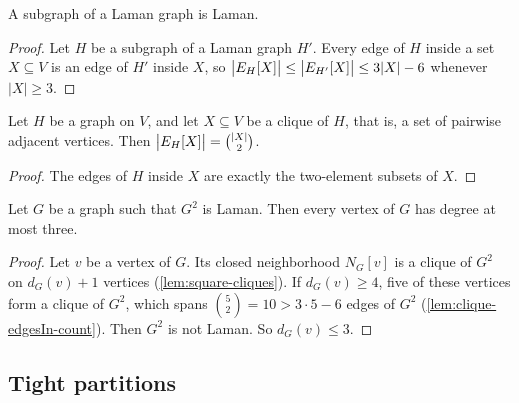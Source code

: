 \begin{lemma}[Monotonicity]
  \label{lem:isLaman3-mono}
  \leanok
  A subgraph of a Laman graph is Laman.
\end{lemma}
\begin{proof}
  \leanok
  Let $H$ be a subgraph of a Laman graph $H'$. Every edge of $H$ inside
  a set $X \subseteq V$ is an edge of $H'$ inside $X$, so
  $\bigl|\edgesIn[H]{X}\bigr| \le \bigl|\edgesIn[H']{X}\bigr|
  \le 3|X| - 6$ whenever $|X| \ge 3$.
\end{proof}

\begin{lemma}
  \label{lem:clique-edgesIn-count}
  \leanok
  Let $H$ be a graph on $V$, and let $X \subseteq V$ be a clique of $H$,
  that is, a set of pairwise adjacent vertices. Then
  $\bigl|\edgesIn[H]{X}\bigr| = \binom{|X|}{2}$.
\end{lemma}
\begin{proof}
  \leanok
  The edges of $H$ inside $X$ are exactly the two-element subsets of
  $X$.
\end{proof}

\begin{lemma}
  \label{lem:isLaman3-degree-le-three}
  \leanok
  Let $G$ be a graph such that $G^2$ is Laman. Then every vertex of $G$
  has degree at most three.
\end{lemma}
\begin{proof}
  \leanok
  Let $v$ be a vertex of $G$. Its closed neighborhood $N_G[v]$ is a
  clique of $G^2$ on $d_G(v) + 1$ vertices (\cref{lem:square-cliques}).
  If $d_G(v) \ge 4$, five of these vertices form a clique of $G^2$,
  which spans $\binom{5}{2} = 10 > 3 \cdot 5 - 6$ edges of $G^2$
  (\cref{lem:clique-edgesIn-count}). Then $G^2$ is not Laman. So
  $d_G(v) \le 3$.
\end{proof}

\subsection{Tight partitions}
\label{sec:jacobs-tight-partitions}

